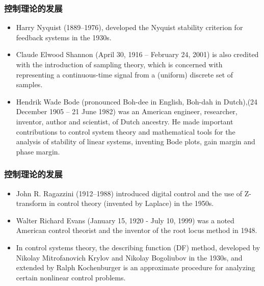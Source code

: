 \documentclass{beamer}
\begin{document}
\begin{frame}
\frametitle{控制理论的发展}
\label{sec-1-9}

\begin{itemize}
\item <1> Harry Nyquist (1889–1976), developed the Nyquist stability criterion for feedback systems in the 1930s.
\item <2> Claude Elwood Shannon (April 30, 1916 – February 24, 2001) is also credited with the introduction of sampling theory, which is concerned with representing a continuous-time signal from a (uniform) discrete set of samples.
\end{itemize}
\begin{itemize}
\item <3> Hendrik Wade Bode (pronounced Boh-dee in English, Boh-dah in Dutch),(24 December 1905 – 21 June 1982) was an American engineer, researcher, inventor, author and scientist, of Dutch ancestry.
      He made important contributions to control system theory and mathematical tools for the analysis of stability of linear systems, inventing Bode plots, gain margin and phase margin.
\end{itemize}
\end{frame}
\begin{frame}
\frametitle{控制理论的发展}
\label{sec-1-10}

\begin{itemize}
\item <1> John R. Ragazzini (1912–1988) introduced digital control and the use of Z-transform in control theory (invented by Laplace) in the 1950s.
\item <2> Walter Richard Evans (January 15, 1920 - July 10, 1999) was a noted American control theorist and the inventor of the root locus method in 1948.
\item <3> In control systems theory, the describing function (DF) method, developed by Nikolay Mitrofanovich Krylov and Nikolay Bogoliubov in the 1930s, and extended by Ralph Kochenburger is an approximate procedure for analyzing certain nonlinear control problems.
\end{itemize}
\end{frame}
\end{document}
